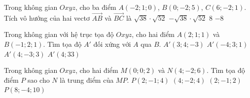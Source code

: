 \begin{ex}%
Trong không gian $Oxyz$, cho ba điểm $A(-2; 1; 0)$, $B(0;-2; 5)$, $C(6;-2;1)$. Tích vô hướng của hai vectơ $\overrightarrow{AB}$ và $\overrightarrow{BC}$ là
\choice
{$\sqrt{38}\cdot\sqrt{52}$}
{$-\sqrt{38}\cdot\sqrt{52}$}
{$8$}
{\True $-8$}
\end{ex}


\begin{ex}%
Trong không gian với hệ trục tọa độ $Oxyz$, cho hai điểm $A(2;1;1)$ và $B(-1;2;1)$. Tìm tọa độ $A'$ đối xứng với $A$ qua $B$.
\choice
{$A'(3;4;-3)$}
{\True $A'(-4;3;1)$}
{$A'(4;-3;3)$}
{$A'(4;33)$}
\end{ex}


\begin{ex}%
Trong không gian $Oxyz$, cho hai điểm $M(0;0;2)$ và $N(4;-2;6)$. Tìm tọa độ điểm $P$ sao cho $N$ là trung điểm của $MP$.
\choice
{$P(2;-1;4)$}
{$(4;-2;4)$}
{$(2;-1;2)$}
{\True $P(8;-4; 10)$}
\end{ex}


